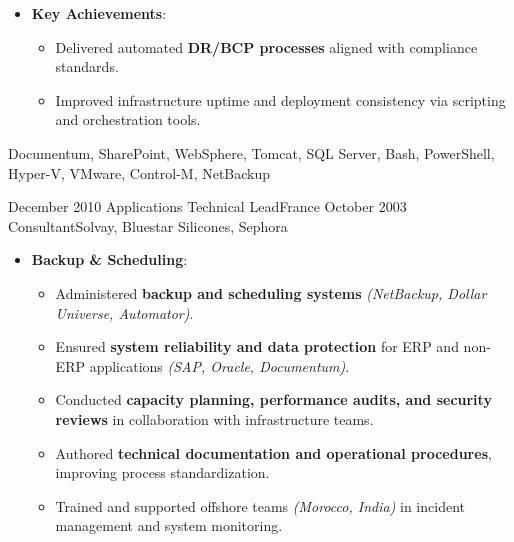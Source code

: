 \begin{experiences}
{\begin{itemize}[left=0pt,label={},itemsep=0.4em]
          \item \textbf{Key Achievements}:
            \begin{itemize}[itemsep=0.2em,topsep=0.2em,parsep=0pt]
              \small
              \item Delivered automated \textbf{DR/BCP processes} aligned with compliance standards.
              \item Improved infrastructure uptime and deployment consistency via scripting and orchestration tools.
            \end{itemize}
        \end{itemize}
       \vspace{0.5em}  %
    }
    {Documentum, SharePoint, WebSphere, Tomcat, SQL Server, Bash, PowerShell, Hyper-V, VMware, Control-M, NetBackup}

\emptySeparator

\consultantexperience
    {December 2010} {Applications Technical Lead}{}{France}
    {October 2003}    {Consultant}{Solvay, Bluestar Silicones, Sephora} {
        \begin{itemize}[left=0pt,label={},itemsep=0.5em]
        \vspace{0.5em}  %
          \item \textbf{Backup \& Scheduling}:
            \begin{itemize}[itemsep=0.2em,topsep=0.2em,parsep=0pt]
              \small
              \item Administered \textbf{backup and scheduling systems} \emph{(NetBackup, Dollar Universe, Automator)}.
              \item Ensured \textbf{system reliability and data protection} for ERP and non-ERP applications \emph{(SAP, Oracle, Documentum)}.
              \item Conducted \textbf{capacity planning, performance audits, and security reviews} in collaboration with infrastructure teams.
              \item Authored \textbf{technical documentation and operational procedures}, improving process standardization.
              \item Trained and supported offshore teams \emph{(Morocco, India)} in incident management and system monitoring.
            \end{itemize}


\end{itemize}}
\end{experiences}
